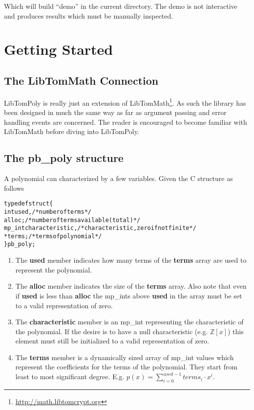 \documentclass[b5paper]{book}
\def\Z{{\mathbb Z}}
\begin{document}
Which will build ``demo'' in the current directory.  The demo is not interactive and produces results which must be manually
inspected.

\chapter{Getting Started}

\section{The LibTomMath Connection}
LibTomPoly is really just an extension of LibTomMath\footnote{\url{http://math.libtomcrypt.org}}.  As such the library has 
been designed in much the same way as far as argument passing and error handling events are concerned.  The reader is 
encouraged to become familiar with LibTomMath before diving into LibTomPoly.

\section{The pb\_poly structure}
A polynomial can characterized by a few variables.  Given the C structure as follows

\begin{alltt}
typedef struct \{
   int    used,                  /* number of terms */
          alloc;                 /* number of terms available (total) */
   mp_int characteristic,        /* characteristic, zero if not finite */
          *terms;                /* terms of polynomial */
\} pb_poly;
\end{alltt}

\begin{enumerate}
   \item The \textbf{used} member indicates how many terms of the \textbf{terms} array are used to represent the polynomial.
   \item The \textbf{alloc} member indicates the size of the \textbf{terms} array.  Also note that even if \textbf{used}
         is less than \textbf{alloc} the mp\_ints above \textbf{used} in the array must be set to a valid representation 
         of zero.
   \item The \textbf{characteristic} member is an mp\_int representing the characteristic of the polynomial.  If the desire is to
         have a null characteristic (e.g. $\Z[x]$) this element must still be initialized to a valid representation
         of zero. 
   \item The \textbf{terms} member is a dynamically sized array of mp\_int values which represent the coefficients for
         the terms of the polynomial.  They start from least to most significant degree.  E.g. $p(x) = \sum_{i=0}^{used-1} terms_i \cdot x^i$.
\end{enumerate}
\end{document}

